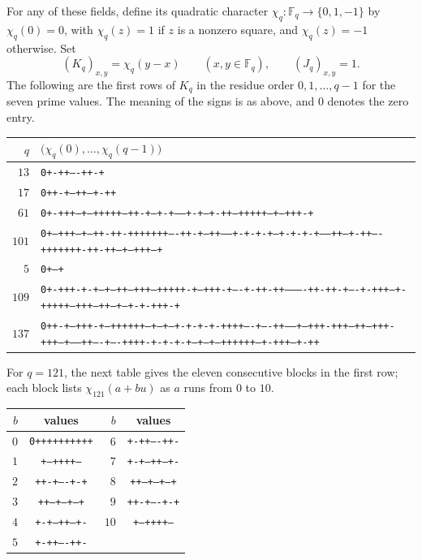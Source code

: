 \documentclass[10pt]{article}
\begin{document}
For any of these fields, define its quadratic character
$\chi_q\colon\mathbb F_q\to\{0,1,-1\}$ by $\chi_q(0)=0$, with
$\chi_q(z)=1$ if $z$ is a nonzero square, and $\chi_q(z)=-1$ otherwise.
Set
\[
 (K_q)_{x,y}=\chi_q(y-x)\qquad(x,y\in\mathbb F_q),
 \qquad (J_q)_{x,y}=1.
\]
The following are the first rows of $K_q$ in the residue order
$0,1,\ldots,q-1$ for the seven prime values. The meaning of the signs is
as above, and $0$ denotes the zero entry.
\begin{center}\fontsize{5}{6}\selectfont
\begin{tabular}{rl}
$q$&$\bigl(\chi_q(0),\ldots,\chi_q(q-1)\bigr)$\\\hline
$13$&\texttt{0+-++----++-+}\\
$17$&\texttt{0++-+---++---+-++}\\
$61$&\texttt{0+-+++---+--+++++--++-+--+-+------+-+--+-++--+++++--+---+++-+}\\
$101$&\texttt{0+--+++--+---++-++-+++++++----++-+--++-----+-+-+-+--+-+-+-+-----++--+-++----+++++++-++-++---+--+++--+}\\
$5$&\texttt{0+--+}\\
$109$&\texttt{0+-+++-+-+--+--++---+++--+++++-+--+++-+----+-++-++----------++-++-+----+-+++--+-+++++--+++---++--+--+-+-+++-+}\\
$137$&\texttt{0++-+--+++-+--++++++--+--+--+-+-+-+-++++----+----++-----+--+++-+++--++--+++-+++--+-----++----+----++++-+-+-+-+--+--+--++++++--+-+++--+-++}\\
\end{tabular}
\end{center}
For $q=121$, the next table gives the eleven consecutive blocks in the
first row; each block lists $\chi_{121}(a+bu)$ as $a$ runs from $0$ to $10$.
\begin{center}\small
\begin{tabular}{rc@{\qquad}rc}
$b$&values&$b$&values\\\hline
$0$&\texttt{0++++++++++}&$6$&\texttt{+-++----++-}\\
$1$&\texttt{+---++++---}&$7$&\texttt{+-+--++--+-}\\
$2$&\texttt{++-+----+-+}&$8$&\texttt{++--+--+--+}\\
$3$&\texttt{++--+--+--+}&$9$&\texttt{++-+----+-+}\\
$4$&\texttt{+-+--++--+-}&$10$&\texttt{+---++++---}\\
$5$&\texttt{+-++----++-}&&\\
\end{tabular}
\end{center}
\end{document}

